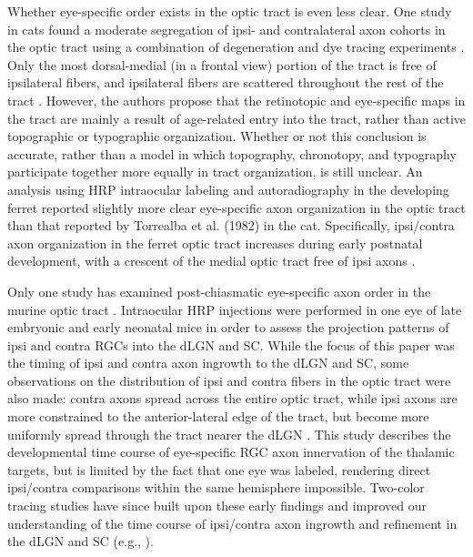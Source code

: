 Whether eye-specific order exists in the optic tract is even less clear.
One study in cats found a moderate segregation of ipsi- and contralateral axon cohorts in the optic tract using a combination of degeneration and dye tracing experiments \cite{torrealba1982studies}.
Only the most dorsal-medial (in a frontal view) portion of the tract is free of ipsilateral fibers, and ipsilateral fibers are scattered throughout the rest of the tract \cite{torrealba1982studies}.
However, the authors propose that the retinotopic and eye-specific maps in the tract are mainly a result of age-related entry into the tract, rather than active topographic or typographic organization.
Whether or not this conclusion is accurate, rather than a model in which topography, chronotopy, and typography participate together more equally in tract organization, is still unclear.
An analysis using HRP intraocular labeling and autoradiography in the developing ferret reported slightly more clear eye-specific axon organization in the optic tract \cite{linden1981dorsal} than that reported by Torrealba et al. (1982) in the cat.
Specifically, ipsi/contra axon organization in the ferret optic tract increases during early postnatal development, with a crescent of the medial optic tract free of ipsi axons \cite{linden1981dorsal}.

Only one study has examined post-chiasmatic eye-specific axon order in the murine optic tract \cite{godement1984prenatal}.
Intraocular HRP injections were performed in one eye of late embryonic and early neonatal mice in order to assess the projection patterns of ipsi and contra RGCs into the dLGN and SC.
While the focus of this paper was the timing of ipsi and contra axon ingrowth to the dLGN and SC, some observations on the distribution of ipsi and contra fibers in the optic tract were also made: contra axons spread across the entire optic tract, while ipsi axons are more constrained to the anterior-lateral edge of the tract, but become more uniformly spread through the tract nearer the dLGN \cite{godement1984prenatal}.
This study describes the developmental time course of eye-specific RGC axon innervation of the thalamic targets, but is limited by the fact that one eye was labeled, rendering direct ipsi/contra comparisons within the same hemisphere impossible.
Two-color tracing studies have since built upon these early findings and improved our understanding of the time course of ipsi/contra axon ingrowth and refinement in the dLGN and SC (e.g., ).

